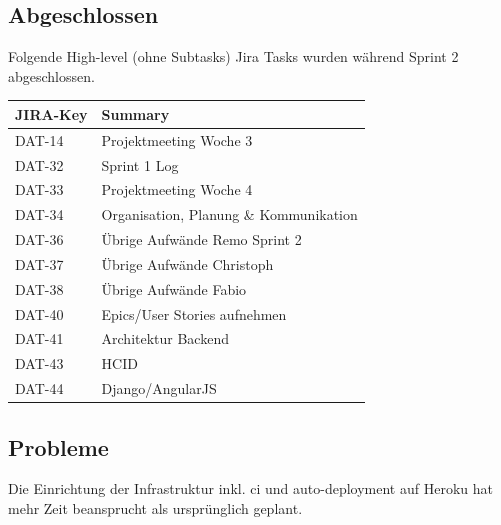 \subsection*{Abgeschlossen}
Folgende High-level (ohne Subtasks) Jira Tasks wurden während Sprint 2 abgeschlossen.

\begin{table}[H]
\centering
\begin{tabular}{ll}
	\toprule
	\textbf{JIRA-Key} & \textbf{Summary}\\
	\midrule
		DAT-14 & Projektmeeting Woche 3\\
		DAT-32 & Sprint 1 Log\\
		DAT-33 & Projektmeeting Woche 4\\
		DAT-34 & Organisation, Planung \& Kommunikation\\
		DAT-36 & Übrige Aufwände Remo Sprint 2\\
		DAT-37 & Übrige Aufwände Christoph\\
		DAT-38 & Übrige Aufwände Fabio\\
		DAT-40 & Epics/User Stories aufnehmen\\
		DAT-41 & Architektur Backend\\
		DAT-43 & HCID\\
		DAT-44 & Django/AngularJS\\
	\bottomrule
\end{tabular}	
\end{table}

\subsection*{Probleme}
Die Einrichtung der Infrastruktur inkl. \gls{ci} und auto-deployment auf Heroku hat mehr Zeit beansprucht als ursprünglich geplant.
